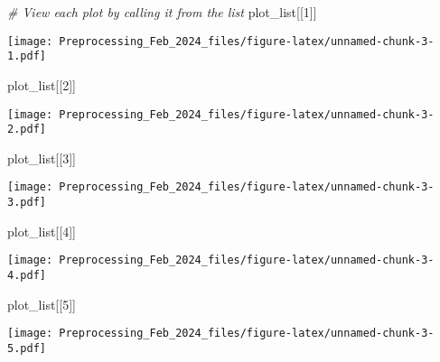 \documentclass[
]{article}
\newenvironment{Shaded}{\begin{snugshade}}{\end{snugshade}}
\newcommand{\CommentTok}[1]{\textcolor[rgb]{0.56,0.35,0.01}{\textit{#1}}}
\newcommand{\DecValTok}[1]{\textcolor[rgb]{0.00,0.00,0.81}{#1}}
\newcommand{\NormalTok}[1]{#1}
\begin{document}
\begin{Shaded}
\begin{Highlighting}[]
\CommentTok{\# View each plot by calling it from the list}
\NormalTok{plot\_list[[}\DecValTok{1}\NormalTok{]]}
\end{Highlighting}
\end{Shaded}

\texttt{[image: Preprocessing\_Feb\_2024\_files/figure-latex/unnamed-chunk-3-1.pdf]}

\begin{Shaded}
\begin{Highlighting}[]
\NormalTok{plot\_list[[}\DecValTok{2}\NormalTok{]]}
\end{Highlighting}
\end{Shaded}

\texttt{[image: Preprocessing\_Feb\_2024\_files/figure-latex/unnamed-chunk-3-2.pdf]}

\begin{Shaded}
\begin{Highlighting}[]
\NormalTok{plot\_list[[}\DecValTok{3}\NormalTok{]]}
\end{Highlighting}
\end{Shaded}

\texttt{[image: Preprocessing\_Feb\_2024\_files/figure-latex/unnamed-chunk-3-3.pdf]}

\begin{Shaded}
\begin{Highlighting}[]
\NormalTok{plot\_list[[}\DecValTok{4}\NormalTok{]]}
\end{Highlighting}
\end{Shaded}

\texttt{[image: Preprocessing\_Feb\_2024\_files/figure-latex/unnamed-chunk-3-4.pdf]}

\begin{Shaded}
\begin{Highlighting}[]
\NormalTok{plot\_list[[}\DecValTok{5}\NormalTok{]]}
\end{Highlighting}
\end{Shaded}

\texttt{[image: Preprocessing\_Feb\_2024\_files/figure-latex/unnamed-chunk-3-5.pdf]}
\end{document}
